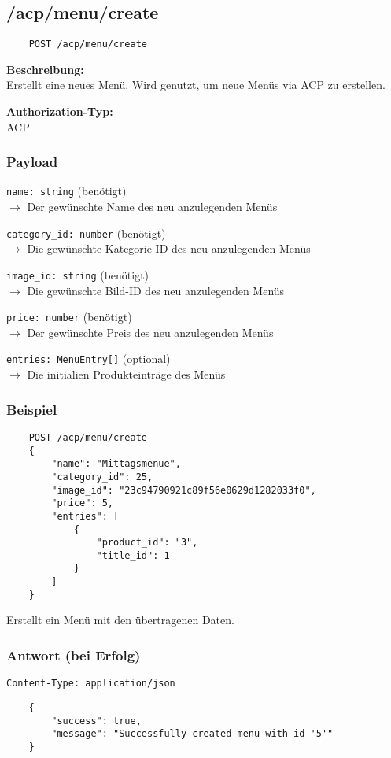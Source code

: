 \subsection{/acp/menu/create}

\begin{lstlisting}
    POST /acp/menu/create
\end{lstlisting}

\textbf{Beschreibung:} \\
Erstellt eine neues Menü. Wird genutzt, um neue Menüs via ACP zu erstellen.

\textbf{Authorization-Typ:} \\
ACP

\subsubsection{Payload}

\lstinline{name: string} (benötigt) \\
$\rightarrow$ Der gewünschte Name des neu anzulegenden Menüs

\lstinline{category_id: number} (benötigt) \\
$\rightarrow$ Die gewünschte Kategorie-ID des neu anzulegenden Menüs

\lstinline{image_id: string} (benötigt) \\
$\rightarrow$ Die gewünschte Bild-ID des neu anzulegenden Menüs

\lstinline{price: number} (benötigt) \\
$\rightarrow$ Der gewünschte Preis des neu anzulegenden Menüs

\lstinline{entries: MenuEntry[]} (optional) \\
$\rightarrow$ Die initialien Produkteinträge des Menüs

\subsubsection{Beispiel}

\begin{lstlisting}
    POST /acp/menu/create
    {
        "name": "Mittagsmenue",
        "category_id": 25,
        "image_id": "23c94790921c89f56e0629d1282033f0",
        "price": 5,
        "entries": [
            {
                "product_id": "3",
                "title_id": 1
            }
        ]
    }
\end{lstlisting}

Erstellt ein Menü mit den übertragenen Daten.

\subsubsection{Antwort (bei Erfolg)}

\lstinline{Content-Type: application/json}
\begin{lstlisting}
    {
        "success": true, 
        "message": "Successfully created menu with id '5'"
    }
\end{lstlisting}